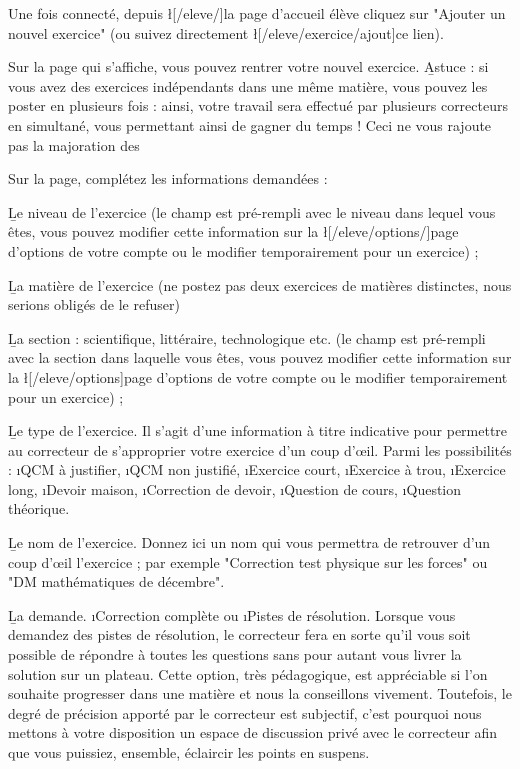 ﻿Une fois connecté, depuis \l[/eleve/]{la page d'accueil élève} cliquez sur "Ajouter un nouvel exercice" (ou suivez directement \l[/eleve/exercice/ajout]{ce lien}).

Sur la page qui s'affiche, vous pouvez rentrer votre nouvel exercice.
\b{Astuce} : si vous avez des exercices indépendants dans une même matière, vous pouvez les poster en plusieurs fois : ainsi, votre travail sera effectué par plusieurs correcteurs en simultané, vous permettant ainsi de gagner du temps ! Ceci ne vous rajoute pas la majoration des %

Sur la page, complétez les informations demandées :
\item \b{Le niveau de l'exercice} (le champ est pré-rempli avec le niveau dans lequel vous êtes, vous pouvez modifier cette information sur la \l[/eleve/options/]{page d'options de votre compte} ou le modifier temporairement pour un exercice) ;
\item \b{La matière} de l'exercice (ne postez pas deux exercices de matières distinctes, nous serions obligés de le refuser)
\item \b{La section} : scientifique, littéraire, technologique etc. (le champ est pré-rempli avec la section dans laquelle vous êtes, vous pouvez modifier cette information sur la \l[/eleve/options]{page d'options de votre compte} ou le modifier temporairement pour un exercice) ;
\item \b{Le type de l'exercice}. Il s'agit d'une information à titre indicative pour permettre au correcteur de s'approprier votre exercice d'un coup d'œil. Parmi les possibilités : \i{QCM à justifier}, \i{QCM non justifié}, \i{Exercice court}, \i{Exercice à trou}, \i{Exercice long}, \i{Devoir maison}, \i{Correction de devoir}, \i{Question de cours}, \i{Question théorique}.
\item \b{Le nom de l'exercice}. Donnez ici un nom qui vous permettra de retrouver d'un coup d'œil l'exercice ; par exemple "Correction test physique sur les forces" ou "DM mathématiques de décembre".
\item \b{La demande}. \i{Correction complète} ou \i{Pistes de résolution}. Lorsque vous demandez des pistes de résolution, le correcteur fera en sorte qu'il vous soit possible de répondre à toutes les questions sans pour autant vous livrer la solution sur un plateau. Cette option, très pédagogique, est appréciable si l'on souhaite progresser dans une matière et nous la conseillons vivement. Toutefois, le degré de précision apporté par le correcteur est subjectif, c'est pourquoi nous mettons à votre disposition un espace de discussion privé avec le correcteur afin que vous puissiez, ensemble, éclaircir les points en suspens.
